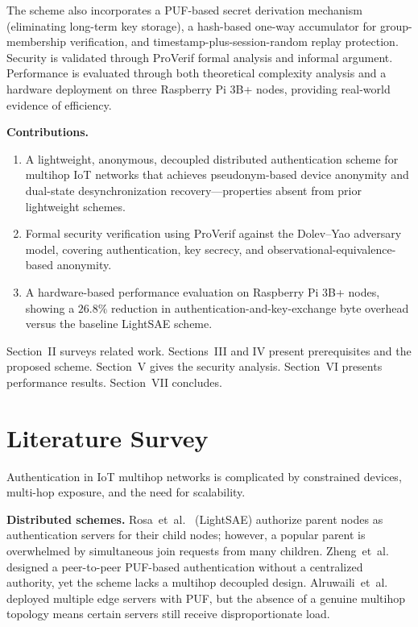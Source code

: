 \documentclass[conference]{IEEEtran}
\begin{document}
The scheme also incorporates a PUF-based secret derivation mechanism
(eliminating long-term key storage), a hash-based one-way accumulator for
group-membership verification, and timestamp-plus-session-random replay
protection.  Security is validated through ProVerif formal analysis and
informal argument.  Performance is evaluated through both theoretical
complexity analysis and a hardware deployment on three Raspberry Pi 3B+
nodes, providing real-world evidence of efficiency.

\textbf{Contributions.}
\begin{enumerate}
  \item A lightweight, anonymous, decoupled distributed authentication scheme
    for multihop IoT networks that achieves pseudonym-based device anonymity
    and dual-state desynchronization recovery—properties absent from prior
    lightweight schemes.
  \item Formal security verification using ProVerif against the Dolev–Yao
    adversary model, covering authentication, key secrecy, and
    observational-equivalence-based anonymity.
  \item A hardware-based performance evaluation on Raspberry Pi 3B+
    nodes, showing a $26.8\%$ reduction in authentication-and-key-exchange
    byte overhead versus the baseline LightSAE scheme.
\end{enumerate}

Section~II surveys related work.  Sections~III and IV present prerequisites
and the proposed scheme.  Section~V gives the security analysis.
Section~VI presents performance results.  Section~VII concludes.

\section{Literature Survey}

Authentication in IoT multihop networks is complicated by constrained
devices, multi-hop exposure, and the need for scalability.

\textbf{Distributed schemes.}
Rosa~et~al.~\cite{rosa2023lightsae} (LightSAE) authorize parent nodes as
authentication servers for their child nodes; however, a popular parent is
overwhelmed by simultaneous join requests from many children.
Zheng~et~al.~\cite{zheng2022puf} designed a peer-to-peer PUF-based
authentication without a centralized authority, yet the scheme lacks a
multihop decoupled design.
Alruwaili~et~al.~\cite{alruwaili2025raaf} deployed multiple edge servers
with PUF, but the absence of a genuine multihop topology means certain
servers still receive disproportionate load.
\end{document}
